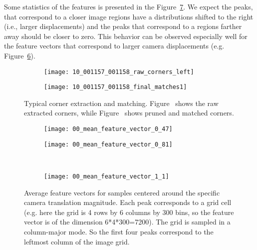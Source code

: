 Some statistics of the features is presented in the
Figure~\ref{fig:feature_vectors}. We expect the peaks, that correspond
to a closer image regions have a distributions shifted to the right
(i.e., larger displacements) and the peaks that correspond to a
regions farther away should be closer to zero.  This behavior can be
observed especially well for the feature vectors that correspond to
larger camera displacements (e.g. Figure~\ref{fig:1c}).

\begin{figure}[!ht]
  \centering
  \begin{subfigure}{.45\linewidth}
    \centering
    \texttt{[image: 10\_001157\_001158\_raw\_corners\_left]}
    \caption{}
    \label{fig:ex_corner_and_matching:corner}
  \end{subfigure}
  \begin{subfigure}{.45\linewidth}
    \texttt{[image: 10\_001157\_001158\_final\_matches1]}
    \caption{}
    \label{fig:ex_corner_and_matching:match}    
  \end{subfigure}
  \caption{Typical corner extraction and
    matching. Figure~ shows the raw
    extracted corners, while Figure~ shows
    pruned and matched corners.}
  \label{fig:ex_corner_and_matching}
\end{figure}

\begin{figure}[!ht]
  \centering
  \begin{subfigure}{.45\linewidth}
    \centering
    \texttt{[image: 00\_mean\_feature\_vector\_0\_47]}
    \caption{}\label{fig:1a}
  \end{subfigure}%
  \begin{subfigure}{.45\linewidth}
    \centering
    \texttt{[image: 00\_mean\_feature\_vector\_0\_81]}
    \caption{}\label{fig:1b}
  \end{subfigure}%
  \\
  \begin{subfigure}{\linewidth}
    \centering
    \texttt{[image: 00\_mean\_feature\_vector\_1\_1]}
    \caption{}\label{fig:1c}
  \end{subfigure}%
  \caption{Average feature vectors for samples centered around the
    specific camera translation magnitude.  Each peak corresponds to a
    grid cell (e.g. here the grid is 4 rows by 6 columns by 300 bins,
    so the feature vector is of the dimension 6*4*300=7200).  The grid
    is sampled in a column-major mode. So the first four peaks
    correspond to the leftmost column of the image grid.}
  \label{fig:feature_vectors}
\end{figure}

